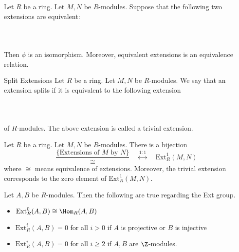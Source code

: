 \documentclass[a4paper]{article}
\begin{document}
\begin{prp}{}{} Let $R$ be a ring. Let $M,N$ be $R$-modules. Suppose that the following two extensions are equivalent: \\~\\
 \\~\\
Then $\phi$ is an isomorphism. Moreover, equivalent extensions is an equivalence relation. 
\end{prp}

\begin{defn}{Split Extensions}{} Let $R$ be a ring. Let $M,N$ be $R$-modules. We say that an extension splits if it is equivalent to the following extension \\~\\
 \\~\\
of $R$-modules. The above extension is called a trivial extension. 
\end{defn}

\begin{prp}{}{} Let $R$ be a ring. Let $M,N$ be $R$-modules. There is a bijection $$\frac{\{\text{Extensions of }M\text{ by }N\}}{\cong}\;\;\;\;\overset{1:1}{\longleftrightarrow}\;\;\;\;\text{Ext}_R^1(M,N)$$ where $\cong$ means equivalence of extensions. Moreover, the trivial extension corresponds to the zero element of $\text{Ext}_R^1(M,N)$. 
\end{prp}

\begin{prp}{}{} Let $A,B$ be $R$-modules. Then the following are true regarding the Ext group. 
\begin{itemize}
\item $\text{Ext}_R^0(A,B)\cong\Hom_R(A,B)$
\item $\text{Ext}_R^i(A,B)=0$ for all $i>0$ if $A$ is projective or $B$ is injective
\item $\text{Ext}_R^i(A,B)=0$ for all $i\geq 2$ if $A,B$ are $\Z$-modules. 
\end{itemize}
\end{prp}
\end{document}
